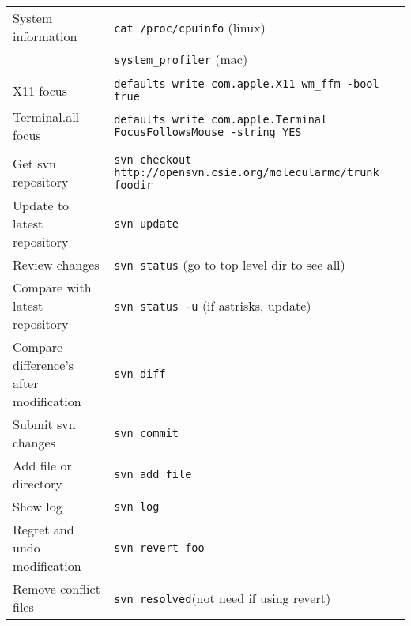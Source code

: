\documentclass[a4paper,10pt]{article}
\begin{document}
\begin{table}
\begin{tabular}{ll}
System information  & \verb"cat /proc/cpuinfo" (linux) \\
                    & \verb"system_profiler" (mac) \\
\\
X11 focus           & \verb"defaults write com.apple.X11 wm_ffm -bool true"\\
Terminal.all focus  & \verb"defaults write com.apple.Terminal FocusFollowsMouse -string YES"\\
\\
Get svn repository   & \verb"svn checkout http://opensvn.csie.org/molecularmc/trunk foodir"\\
Update to latest repository & \verb"svn update"\\
Review changes       & \verb"svn status" (go to top level dir to see all)\\
Compare with latest repository & \verb"svn status -u" (if astrisks, update)\\
Compare difference's after modification& \verb"svn diff"\\
Submit svn changes   & \verb"svn commit"\\
Add file or directory& \verb"svn add file"\\
Show log             & \verb"svn log"\\
Regret and undo modification & \verb"svn revert foo"\\
Remove conflict files        & \verb"svn resolved"(not need if using revert)\\
\hline
\end{tabular}
\end{table}
\end{document}
